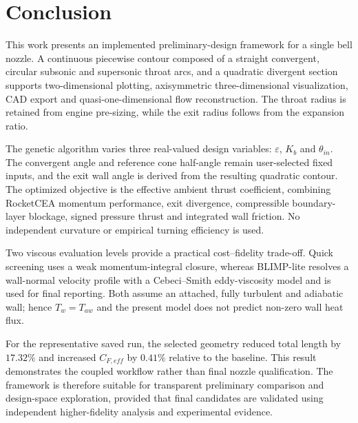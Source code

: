 \section{Conclusion}

This work presents an implemented preliminary-design framework for a single bell
nozzle. A continuous piecewise contour composed of a straight convergent, circular
subsonic and supersonic throat arcs, and a quadratic divergent section supports
two-dimensional plotting, axisymmetric three-dimensional visualization, CAD export
and quasi-one-dimensional flow reconstruction. The throat radius is retained from
engine pre-sizing, while the exit radius follows from the expansion ratio.

The genetic algorithm varies three real-valued design variables:
\(\varepsilon\), \(K_b\) and \(\theta_{in}\). The convergent angle and reference
cone half-angle remain user-selected fixed inputs, and the exit wall angle is derived
from the resulting quadratic contour. The optimized objective is the effective
ambient thrust coefficient, combining RocketCEA momentum performance, exit divergence,
compressible boundary-layer blockage, signed pressure thrust and integrated wall
friction. No independent curvature or empirical turning efficiency is used.

Two viscous evaluation levels provide a practical cost--fidelity trade-off. Quick
screening uses a weak momentum-integral closure, whereas BLIMP-lite resolves a
wall-normal velocity profile with a Cebeci--Smith eddy-viscosity model and is used for
final reporting. Both assume an attached, fully turbulent and adiabatic wall; hence
\(T_w=T_{aw}\) and the present model does not predict non-zero wall heat flux.

For the representative saved run, the selected geometry reduced total length by
\(17.32\%\) and increased \(C_{F,eff}\) by \(0.41\%\) relative to the baseline.
This result demonstrates the coupled workflow rather than final nozzle qualification.
The framework is therefore suitable for transparent preliminary comparison and
design-space exploration, provided that final candidates are validated using
independent higher-fidelity analysis and experimental evidence.

